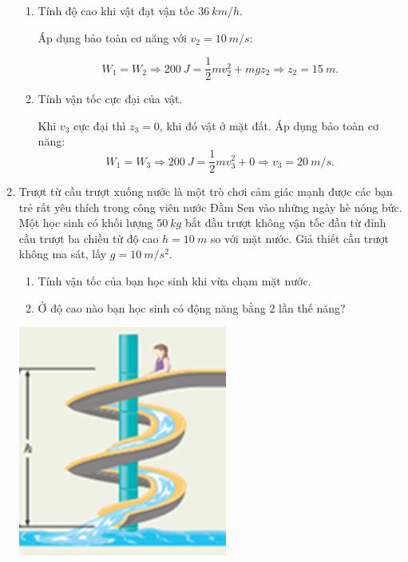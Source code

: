 \begin{enumerate}[label=\bfseries Câu \arabic*:]
{\begin{enumerate}[label=\alph*)]
			\item Tính độ cao khi vật đạt vận tốc $\SI{36}{km/h}$.
			
			Áp dụng bảo toàn cơ năng với $v_2 = \SI{10}{m/s}$:
			
			$$W_1 = W_2 \Rightarrow \SI{200}{J} = \dfrac{1}{2}mv_2^2 + mgz_2 \Rightarrow z_2 = \SI{15}{m}.$$
			
			\item Tính vận tốc cực đại của vật.
			
			Khi $v_3$ cực đại thì $z_3 = 0$, khi đó vật ở mặt đất. Áp dụng bảo toàn cơ năng:
			$$W_1 = W_3 \Rightarrow \SI{200}{J} = \dfrac{1}{2}mv_3^2 + 0 \Rightarrow v_3 = \SI{20}{m/s}.$$
		\end{enumerate}
	}
	\item {}
	
	
	{
		\begin{minipage}[l]{0.7\textwidth}
			Trượt từ cầu trượt xuống nước là một trò chơi cảm giác mạnh được các bạn trẻ rất yêu thích trong công viên nước Đầm Sen vào những ngày hè nóng bức. Một học sinh có khối lượng $\SI{50}{kg}$ bắt đầu trượt không vận tốc đầu từ đỉnh cầu trượt ba chiều từ độ cao $h=\SI{10}{m}$ so với mặt nước. Giả thiết cầu trượt không ma sát, lấy $g=\SI{10}{m/s^2}$.
			\begin{enumerate}[label=\alph*)]
				\item Tính vận tốc của bạn học sinh khi vừa chạm mặt nước.
				\item Ở độ cao nào bạn học sinh có động năng bằng 2 lần thế năng?
			\end{enumerate}
		\end{minipage}
		\begin{minipage}[r]{0.2\textwidth}
			\begin{flushright}
				\hspace*{1cm}\includegraphics[scale=0.7]{../figs/VN10-2022-PH-TP029-1.png}
			\end{flushright}
		\end{minipage}
	}
	

\end{enumerate}
